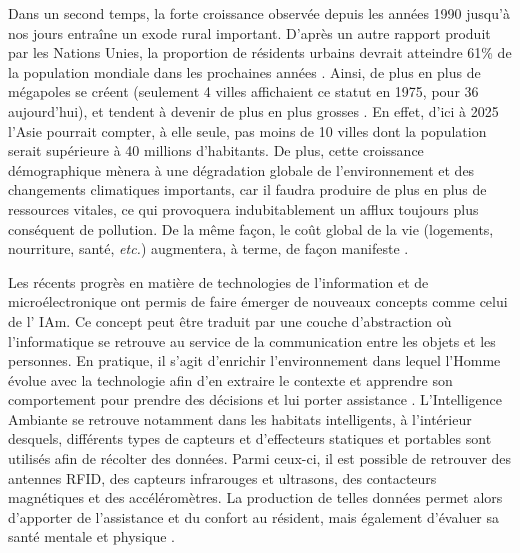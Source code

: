 Dans un second temps, la forte croissance observée depuis les années 1990 jusqu’à nos jours entraîne un exode rural important. D’après un autre rapport produit par les Nations Unies, la proportion de résidents urbains devrait atteindre 61\% de la population mondiale dans les prochaines années \citep{UnitedNations2017a}. Ainsi, de plus en plus de mégapoles se créent (seulement 4 villes affichaient ce statut en 1975, pour 36 aujourd’hui), et tendent à devenir de plus en plus grosses \citep{UnitedNations2017a}. En effet, d’ici à 2025 l’Asie pourrait compter, à elle seule, pas moins de 10 villes dont la population serait supérieure à 40 millions d’habitants. De plus, cette croissance démographique mènera à une dégradation globale de l’environnement et des changements climatiques importants, car il faudra produire de plus en plus de ressources vitales, ce qui provoquera indubitablement un afflux toujours plus conséquent de pollution. De la même façon, le coût global de la vie (logements, nourriture, santé, \textit{etc.}) augmentera, à terme, de façon manifeste \citep{UnitedNations2017a}.

Les récents progrès en matière de technologies de l’information et de microélectronique ont permis de faire émerger de nouveaux concepts comme celui de l’ \ac{IAm}. Ce concept peut être traduit par une couche d’abstraction où l’informatique se retrouve au service de la communication entre les objets et les personnes. En pratique, il s’agit d’enrichir l’environnement dans lequel l’Homme évolue avec la technologie afin d’en extraire le contexte et apprendre son comportement pour prendre des décisions et lui porter assistance \citep{Sadri2011}. L’Intelligence Ambiante se retrouve notamment dans les habitats intelligents, à l’intérieur desquels, différents types de capteurs et d’effecteurs statiques et portables sont utilisés afin de récolter des données. Parmi ceux-ci, il est possible de retrouver des antennes RFID, des capteurs infrarouges et ultrasons, des contacteurs magnétiques et des accéléromètres. La production de telles données permet alors d’apporter de l’assistance et du confort au résident, mais également d’évaluer sa santé mentale et physique \citep{Rashidi2013, Haux2016, Harris2016, Johnson2018}.

